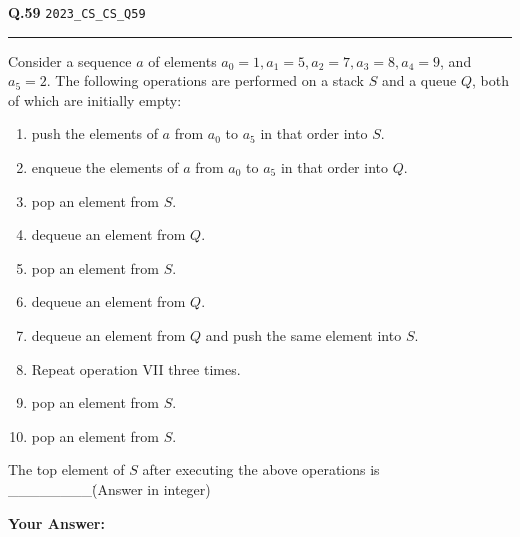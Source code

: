 \documentclass[a4paper,10pt]{article}
\begin{document}
\noindent
\begin{tcolorbox}[
    blanker,
    sidebyside,
    sidebyside align=top,
    lefthand width=0.55\textwidth,
    top=4pt, bottom=4pt, left=0pt, right=0pt,
    middle=16pt,
    underlay={
        \draw[dashed, black!80, line width=0.8pt, dash pattern=on 4pt off 3pt]
            ([xshift=0.55\textwidth+8pt]frame.north west) --
            ([xshift=0.55\textwidth+8pt]frame.south west);
    }
]
\textbf{Q.59}  \hfill {\tiny\texttt{2023\_CS\_CS\_Q59}}
\vspace{2pt}\hrule height 0.3pt\vspace{4pt}

Consider a sequence $a$ of elements $a_0 = 1, a_1 = 5, a_2 = 7, a_3 = 8, a_4 = 9$, and $a_5 = 2$. The following operations are performed on a stack $S$ and a queue $Q$, both of which are initially empty:
\begin{enumerate}[label=\Roman*.,itemsep=0pt,topsep=2pt]
\item push the elements of $a$ from $a_0$ to $a_5$ in that order into $S$.
\item enqueue the elements of $a$ from $a_0$ to $a_5$ in that order into $Q$.
\item pop an element from $S$.
\item dequeue an element from $Q$.
\item pop an element from $S$.
\item dequeue an element from $Q$.
\item dequeue an element from $Q$ and push the same element into $S$.
\item Repeat operation VII three times.
\item pop an element from $S$.
\item pop an element from $S$.
\end{enumerate}
The top element of $S$ after executing the above operations is \_\_\_\_\_\_\_\_\. (Answer in integer)

\par\vspace{6pt}\noindent\textbf{Your Answer:} \fbox{\rule{0pt}{1.3ex}\hspace{3cm}}

\tcblower


\end{tcolorbox}
\end{document}
